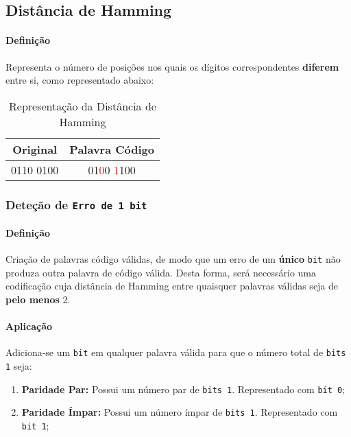 \documentclass{article}
\begin{document}
        \subsection{Distância de Hamming}
            \paragraph{Definição}Representa o número de posições nos quais os dígitos correspondentes \textbf{diferem} entre si, como representado abaixo:
                \begin{table}[H]
                    \centering
                    \begin{tabular}[]{cc}\hline
                        Original  & Palavra Código\\\hline
                        0110 0100 & 01\textcolor{red}{0}0 \textcolor{red}{1}100\\\hline
                    \end{tabular}
                    \caption{Representação da Distância de Hamming}\label{table:HammingDefinition}
                \end{table}\noindent

        \subsubsection{Deteção de \texttt{Erro de 1 bit}}
            \paragraph{Definição}Criação de palavras código válidas, de modo que um erro de um \textbf{único} \texttt{bit} não produza outra palavra de código válida. Desta forma, será necessário uma codificação cuja distância de Hamming entre quaisquer palavras válidas seja de \textbf{pelo menos} 2.

            \paragraph{Aplicação}Adiciona-se um \texttt{bit} em qualquer palavra válida para que o número total de \texttt{bits 1} seja:
                \begin{enumerate}[noitemsep, rightmargin = \leftmargin]
                    \item \textbf{Paridade Par:} Possui um número par de \texttt{bits 1}. Representado com \texttt{bit 0};
                    \item \textbf{Paridade Ímpar:} Possui um número ímpar de \texttt{bits 1}. Representado com \texttt{bit 1};
                \end{enumerate}
\end{document}
